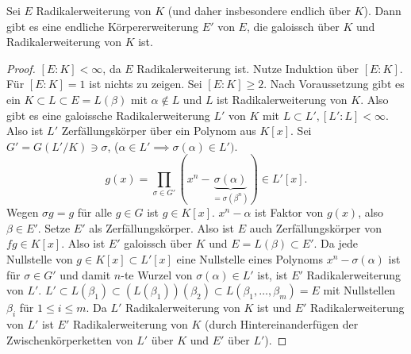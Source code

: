 \begin{lem} \label{20.2-5}
	Sei $E$ Radikalerweiterung von $K$ (und daher insbesondere endlich über $K$).
	Dann gibt es eine endliche Körpererweiterung $E'$ von $E$, die galoissch über $K$ und Radikalerweiterung von $K$ ist.
	\begin{proof}
		$[E : K] < \infty$, da $E$ Radikalerweiterung ist.
		Nutze Induktion über $[E : K]$.
		Für $[E : K] = 1$ ist nichts zu zeigen.
		Sei $[E : K] \ge 2$.
		Nach Voraussetzung gibt es ein $K \subset L \subset E = L(\beta)$ mit $\alpha \not\in L$ und $L$ ist Radikalerweiterung von $K$.
		Also gibt es eine galoissche Radikalerweiterung $L'$ von $K$ mit $L \subset L', [L' : L] < \infty$.
		Also ist $L'$ Zerfällungskörper über ein Polynom aus $K[x]$.
		Sei $G' = G(L' / K) \ni \sigma$, ($\alpha \in L' \implies \sigma(\alpha) \in L')$.
		\[
			g(x) = \prod_{\sigma \in G'} (x^n - \underbrace{\sigma(\alpha)}_{=\sigma(\beta^n)})
			\in L'[x].
		\]
		Wegen $\sigma g = g$ für alle $g \in G$ ist $g \in K[x]$.
		$x^n - \alpha$ ist Faktor von $g(x)$, also $\beta \in E'$.
		Setze $E'$ als Zerfällungskörper.
		Also ist $E$ auch Zerfällungskörper von $fg \in K[x]$.
		Also ist $E'$ galoissch über $K$ und $E = L(\beta) \subset E'$.
		Da jede Nullstelle von $g \in K[x] \subset L'[x]$ eine Nullstelle eines Polynoms $x^n - \sigma(\alpha)$ ist für $\sigma \in G'$ und damit $n$-te Wurzel von $\sigma(\alpha) \in L'$ ist, ist $E'$ Radikalerweiterung von $L'$.
		$L' \subset L(\beta_1) \subset (L(\beta_1))(\beta_2) \subset L(\beta_1, \dotsc, \beta_m) = E$ mit Nullstellen $\beta_i$ für $1\le i \le m$.
		Da $L'$ Radikalerweiterung von $K$ ist und $E'$ Radikalerweiterung von $L'$ ist $E'$ Radikalerweiterung von $K$
		(durch  Hintereinanderfügen der Zwischenkörperketten von $L'$ über $K$ und $E'$ über $L'$).
	\end{proof}
\end{lem}

